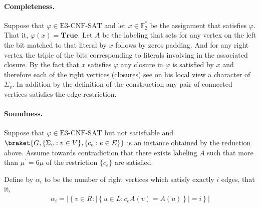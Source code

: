 \documentclass{article}
\begin{document}
%

\paragraph{Completeness. } Suppose that $\varphi \in \text{E3-CNF-SAT}$ and let $x \in \mathbb{F}_{2}^{*}$ be the assignment that satisfies $\varphi$. That it, $\varphi\left( x \right) = \mathbf{True}$. Let $A$ be the labeling that sets for any vertex on the left the bit matched to that literal by $x$ follows by zeros padding. And for any right vertex the triple of the bits corresponding to literals involving in the associated closure. By the fact that $x$ satisfies $\varphi$ any closure in $\varphi$ is satisfied by $x$ and therefore each of the right vertices (closures) see on his local view a character of $\Sigma_{v}$. In addition by the definition of the construction any pair of connected vertices satisfies the edge restriction. 

\paragraph{Soundness.} Suppose that $\varphi \in \text{E3-CNF-SAT}$ but not satisfiable and $\braket{G, \{ \Sigma_{v} : v \in V \}, \{c_{e} : e \in E \}} $ is an instance obtained by the reduction above. Assume towards contradiction that there exists labeling $A$ such that more than $\mu^{\prime}= 6\mu$ of the restriction $\{c_{e}\}$ are satisfied. 

Define by $\alpha_{i}$ to be the number of right vertices which satisfy exactly $i$ edges, that it, 
\begin{equation*}
  \begin{split}
    \alpha_{i} = \left| \left\{ v \in R : | \left\{ u \in L : c_{e}A\left( v \right) = A\left( u \right)   \right\} | = i    \right\} \right| 
  \end{split}
\end{equation*}
\end{document}
